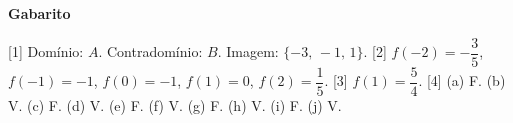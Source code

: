 \documentclass[12pt,a4paper]{article}
\begin{document}
\begin{center}
  \textbf{Gabarito}
\end{center}

[1] Domínio: $A$. Contradomínio: $B$. Imagem: $\{-3,\,-1,\,1\}$. 
[2] $f(-2) = -\dfrac{3}{5}$, $f(-1) = -1$, $f(0) = -1$, $f(1) = 0$, $f(2) = \dfrac{1}{5}$. 
[3] $f(1) = \dfrac{5}{4}$. 
[4] (a) F. (b) V. (c) F. (d) V. (e) F. (f) V. (g) F. (h) V. (i) F. (j) V. 
\end{document}
